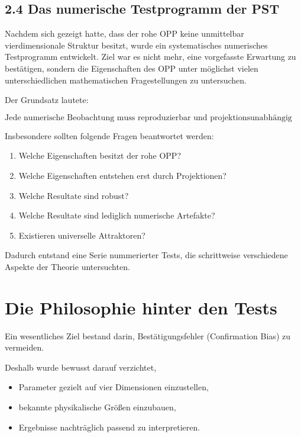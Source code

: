 \subsection{2.4 Das numerische Testprogramm der PST}

Nachdem sich gezeigt hatte, dass der rohe OPP keine unmittelbar vierdimensionale Struktur besitzt, wurde ein systematisches numerisches Testprogramm entwickelt. Ziel war es nicht mehr, eine vorgefasste Erwartung zu bestätigen, sondern die Eigenschaften des OPP unter möglichst vielen unterschiedlichen mathematischen Fragestellungen zu untersuchen.

Der Grundsatz lautete:

\[
\boxed{
\text{Jede numerische Beobachtung muss reproduzierbar und projektionsunabhängig überprüft werden.}
}
\]

Insbesondere sollten folgende Fragen beantwortet werden:

\begin{enumerate}
\item Welche Eigenschaften besitzt der rohe OPP?
\item Welche Eigenschaften entstehen erst durch Projektionen?
\item Welche Resultate sind robust?
\item Welche Resultate sind lediglich numerische Artefakte?
\item Existieren universelle Attraktoren?
\end{enumerate}

Dadurch entstand eine Serie nummerierter Tests, die schrittweise verschiedene Aspekte der Theorie untersuchten.


\section*{Die Philosophie hinter den Tests}

Ein wesentliches Ziel bestand darin, Bestätigungsfehler (Confirmation Bias) zu vermeiden.

Deshalb wurde bewusst darauf verzichtet,

\begin{itemize}
\item Parameter gezielt auf vier Dimensionen einzustellen,
\item bekannte physikalische Größen einzubauen,
\item Ergebnisse nachträglich passend zu interpretieren.
\end{itemize}

